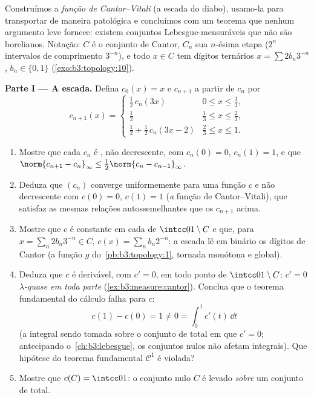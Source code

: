 \begin{problem}
\label{pb:b3:measure:1}
Construímos a \emph{função de Cantor--Vitali} (a escada do diabo),
usamo-la para transportar  de maneira patológica e concluímos com
um teorema que nenhum argumento leve fornece: existem conjuntos
Lebesgue-mensuráveis que não são borelianos. Notação: $C$ é o
conjunto de Cantor, $C_n$ sua $n$-ésima etapa ($2^n$
intervalos de comprimento $3^{-n}$), e todo $x \in C$ tem dígitos
ternários $x = \sum 2b_n3^{-n}$, $b_n \in \{0,1\}$ (\cref{exo:b3:topology:10}).

\medskip
\noindent\textbf{Parte I --- A escada.} Defina $c_0(x) = x$ e $c_{n+1}$ a partir de
$c_n$ por
\[
c_{n+1}(x) = \begin{cases}
\tfrac12\,c_n(3x) & 0 \leq x \leq \tfrac13,\\[2pt]
\tfrac12 & \tfrac13 \leq x \leq \tfrac23,\\[2pt]
\tfrac12 + \tfrac12\,c_n(3x - 2) & \tfrac23 \leq x \leq 1.
\end{cases}
\]
\begin{enumerate}
  \item Mostre que cada $c_n$ é , não decrescente, com $c_n(0) = 0$,
        $c_n(1) = 1$, e que $\norm{c_{n+1} - c_n}_\infty \leq
        \tfrac12\norm{c_n - c_{n-1}}_\infty$.
  \item Deduza que $(c_n)$ converge uniformemente para uma função
        $c$  e não decrescente com $c(0) = 0$, $c(1) = 1$ (\emph{a}
        função de Cantor--Vitali), que satisfaz as mesmas relações
        autossemelhantes que os $c_{n+1}$ acima.
  \item Mostre que $c$ é constante em cada  de
        $\intcc01\setminus C$ e que, para $x = \sum_n
        2b_n3^{-n} \in C$, $c(x) = \sum_n b_n2^{-n}$: a escada lê em binário os dígitos
        de Cantor (a função $g$ do~\cref{pb:b3:topology:1}, tornada monótona e
        global).
  \item Deduza que $c$ é derivável, com $c' = 0$, em todo ponto
        de $\intcc01\setminus C$: $c' = 0$ \emph{$\lambda$-quase em toda parte}
        (\cref{ex:b3:measure:cantor}). Conclua que o teorema fundamental do cálculo
        falha para $c$:
        \[
        c(1) - c(0) = 1 \neq 0 = \int_0^1 c'(t)\,\dd t
        \]
        (a integral sendo tomada sobre o conjunto de  total em
        que $c' = 0$; antecipando o~\cref{ch:b3:lebesgue}, os conjuntos nulos
        não afetam integrais). Que hipótese do teorema fundamental
        $\mathcal C^1$ é violada?
  \item Mostre que $c(C) = \intcc01$: o conjunto nulo $C$ é levado \emph{sobre}
        um conjunto de  total.
\end{enumerate}


\end{problem}
